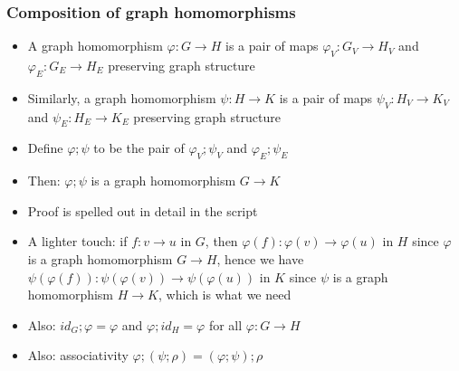 \documentclass[handout]{beamer}
\begin{document}
\frame
  {   
    \frametitle{Composition of graph homomorphisms}\label{Ch2:Ghom-comp}

 \begin{itemize}[<+->]
\item A graph homomorphism $\varphi: G\to H$ is a pair of maps
$\varphi_V : G_V \to H_V$ and $\varphi_E : G_E \to H_E$ preserving graph structure 
\item Similarly, a graph homomorphism $\psi: H\to K$ is a pair of maps
$\psi_V : H_V \to K_V$ and $\psi_E : H_E \to K_E$ preserving graph structure
\item Define $\varphi;\psi$ to be the pair of $\varphi_V;\psi_V$ and $\varphi_E;\psi_E$
\item Then: $\varphi;\psi$ is a graph homomorphism $G\to K$
\item Proof is spelled out in detail in the script
\item A lighter touch: if $f: v\to u$ in $G$, 
then $\varphi(f): \varphi(v)\to \varphi(u)$ in $H$
since $\varphi$ is a graph homomorphism $G\to H$, 
hence we have $\psi(\varphi(f)): \psi(\varphi(v))\to \psi(\varphi(u))$ in $K$
since $\psi$ is a graph homomorphism $H\to K$, 
which is what we need 
\item Also: $id_G ; \varphi = \varphi$ and $\varphi; id_H = \varphi$ for all $\varphi:G\to H$
 \item Also: associativity $\varphi;(\psi;\rho) = (\varphi;\psi);\rho$
 \end{itemize}

 }
\end{document}
